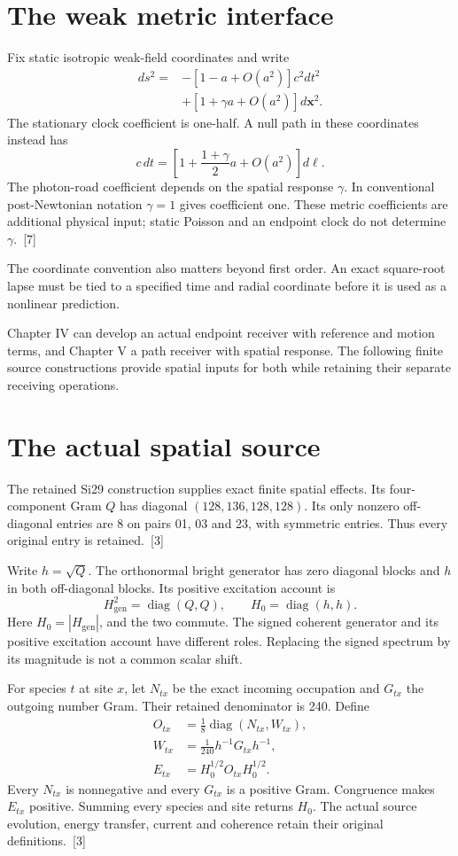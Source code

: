 \documentclass[10pt,twocolumn,letterpaper]{article}
\begin{document}
\section{The weak metric interface}
Fix static isotropic weak-field coordinates and write
\[
\begin{aligned}
ds^2={}&-[1-a+O(a^2)]c^2dt^2\\
&+[1+\gamma a+O(a^2)]d\mathbf x^2.
\end{aligned}
\]
The stationary clock coefficient is one-half. A null path in these coordinates instead has
\[
c\,dt=\left[1+\frac{1+\gamma}{2}a+O(a^2)\right]d\ell.
\]
The photon-road coefficient depends on the spatial response $\gamma$. In conventional post-Newtonian notation $\gamma=1$ gives coefficient one. These metric coefficients are additional physical input; static Poisson and an endpoint clock do not determine $\gamma$.~[7]

The coordinate convention also matters beyond first order. An exact square-root lapse must be tied to a specified time and radial coordinate before it is used as a nonlinear prediction.

Chapter IV can develop an actual endpoint receiver with reference and motion terms, and Chapter V a path receiver with spatial response. The following finite source constructions provide spatial inputs for both while retaining their separate receiving operations.

\section{The actual spatial source}
The retained Si29 construction supplies exact finite spatial effects. Its four-component Gram $Q$ has diagonal $(128,136,128,128)$. Its only nonzero off-diagonal entries are 8 on pairs 01, 03 and 23, with symmetric entries. Thus every original entry is retained.~[3]

Write $h=\sqrt Q$. The orthonormal bright generator has zero diagonal blocks and $h$ in both off-diagonal blocks. Its positive excitation account is
\[
H_{\mathrm{gen}}^2=\operatorname{diag}(Q,Q),\qquad H_0=\operatorname{diag}(h,h).
\]
Here $H_0=|H_{\mathrm{gen}}|$, and the two commute. The signed coherent generator and its positive excitation account have different roles. Replacing the signed spectrum by its magnitude is not a common scalar shift.

For species $t$ at site $x$, let $N_{tx}$ be the exact incoming occupation and $G_{tx}$ the outgoing number Gram. Their retained denominator is 240. Define
\[
\begin{aligned}
O_{tx}&=\frac18\operatorname{diag}(N_{tx},W_{tx}),\\
W_{tx}&=\frac{1}{240}h^{-1}G_{tx}h^{-1},\\
E_{tx}&=H_0^{1/2}O_{tx}H_0^{1/2}.
\end{aligned}
\]
Every $N_{tx}$ is nonnegative and every $G_{tx}$ is a positive Gram. Congruence makes $E_{tx}$ positive. Summing every species and site returns $H_0$. The actual source evolution, energy transfer, current and coherence retain their original definitions.~[3]
\end{document}
